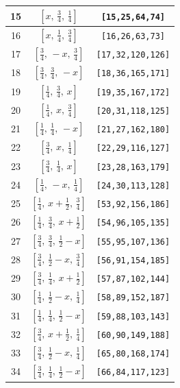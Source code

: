 \documentclass[fleqn,8pt]{jsarticle}
\begin{document}
\begin{longtable}{ccc}
15 & $\left[ x,\, \frac{3}{4},\, \frac{1}{4} \right]$ & {\tt [15,25,64,74]} \\ \hline
16 & $\left[ x,\, \frac{1}{4},\, \frac{3}{4} \right]$ & {\tt [16,26,63,73]} \\ \hline
17 & $\left[ \frac{3}{4},\, - x,\, \frac{3}{4} \right]$ & {\tt [17,32,120,126]} \\ \hline
18 & $\left[ \frac{3}{4},\, \frac{3}{4},\, - x \right]$ & {\tt [18,36,165,171]} \\ \hline
19 & $\left[ \frac{1}{4},\, \frac{3}{4},\, x \right]$ & {\tt [19,35,167,172]} \\ \hline
20 & $\left[ \frac{1}{4},\, x,\, \frac{3}{4} \right]$ & {\tt [20,31,118,125]} \\ \hline
21 & $\left[ \frac{1}{4},\, \frac{1}{4},\, - x \right]$ & {\tt [21,27,162,180]} \\ \hline
22 & $\left[ \frac{3}{4},\, x,\, \frac{1}{4} \right]$ & {\tt [22,29,116,127]} \\ \hline
23 & $\left[ \frac{3}{4},\, \frac{1}{4},\, x \right]$ & {\tt [23,28,163,179]} \\ \hline
24 & $\left[ \frac{1}{4},\, - x,\, \frac{1}{4} \right]$ & {\tt [24,30,113,128]} \\ \hline
25 & $\left[ \frac{1}{4},\, x + \frac{1}{2},\, \frac{3}{4} \right]$ & {\tt [53,92,156,186]} \\ \hline
26 & $\left[ \frac{1}{4},\, \frac{3}{4},\, x + \frac{1}{2} \right]$ & {\tt [54,96,105,135]} \\ \hline
27 & $\left[ \frac{3}{4},\, \frac{3}{4},\, \frac{1}{2} - x \right]$ & {\tt [55,95,107,136]} \\ \hline
28 & $\left[ \frac{3}{4},\, \frac{1}{2} - x,\, \frac{3}{4} \right]$ & {\tt [56,91,154,185]} \\ \hline
29 & $\left[ \frac{3}{4},\, \frac{1}{4},\, x + \frac{1}{2} \right]$ & {\tt [57,87,102,144]} \\ \hline
30 & $\left[ \frac{1}{4},\, \frac{1}{2} - x,\, \frac{1}{4} \right]$ & {\tt [58,89,152,187]} \\ \hline
31 & $\left[ \frac{1}{4},\, \frac{1}{4},\, \frac{1}{2} - x \right]$ & {\tt [59,88,103,143]} \\ \hline
32 & $\left[ \frac{3}{4},\, x + \frac{1}{2},\, \frac{1}{4} \right]$ & {\tt [60,90,149,188]} \\ \hline
33 & $\left[ \frac{3}{4},\, \frac{1}{2} - x,\, \frac{1}{4} \right]$ & {\tt [65,80,168,174]} \\ \hline
34 & $\left[ \frac{3}{4},\, \frac{1}{4},\, \frac{1}{2} - x \right]$ & {\tt [66,84,117,123]} \\ \hline

\end{longtable}
\end{document}
